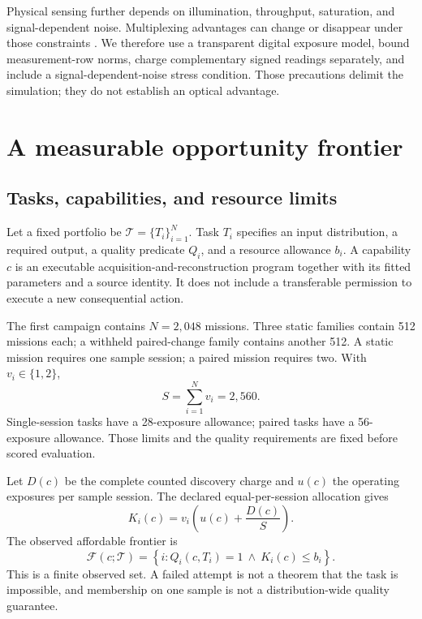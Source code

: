 \documentclass[11pt,a4paper]{article}
\begin{document}
Physical sensing further depends on illumination, throughput, saturation, and signal-dependent noise. Multiplexing advantages can change or disappear under those constraints \citep{ratner2007multiplex}. We therefore use a transparent digital exposure model, bound measurement-row norms, charge complementary signed readings separately, and include a signal-dependent-noise stress condition. Those precautions delimit the simulation; they do not establish an optical advantage.

\section{A measurable opportunity frontier}

\subsection{Tasks, capabilities, and resource limits}

Let a fixed portfolio be \(\mathcal T=\{T_i\}_{i=1}^{N}\). Task \(T_i\) specifies an input distribution, a required output, a quality predicate \(Q_i\), and a resource allowance \(b_i\). A capability \(c\) is an executable acquisition-and-reconstruction program together with its fitted parameters and a source identity. It does not include a transferable permission to execute a new consequential action.

The first campaign contains \(N=2{,}048\) missions. Three static families contain 512 missions each; a withheld paired-change family contains another 512. A static mission requires one sample session; a paired mission requires two. With \(v_i\in\{1,2\}\),
\[
S=\sum_{i=1}^{N}v_i=2{,}560.
\]
Single-session tasks have a 28-exposure allowance; paired tasks have a 56-exposure allowance. Those limits and the quality requirements are fixed before scored evaluation.

Let \(D(c)\) be the complete counted discovery charge and \(u(c)\) the operating exposures per sample session. The declared equal-per-session allocation gives
\begin{equation}
K_i(c)=v_i\left(u(c)+\frac{D(c)}{S}\right).
\label{eq:allocation}
\end{equation}
The observed affordable frontier is
\begin{equation}
\mathcal F(c;\mathcal T)=
\left\{i:Q_i\!\left(c,T_i\right)=1\ \land\ K_i(c)\leq b_i\right\}.
\label{eq:frontier}
\end{equation}
This is a finite observed set. A failed attempt is not a theorem that the task is impossible, and membership on one sample is not a distribution-wide quality guarantee.
\end{document}
